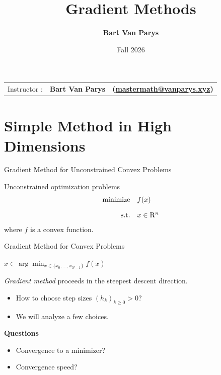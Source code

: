 \documentclass[9pt]{beamer}
\title[Continuous Optimization]{Gradient Methods}
\author[]{\textbf{Bart Van Parys}}
\date[]{Fall 2026}
\begin{document}
\begin{frame}  

  \maketitle

  \vspace{-2em}
  
    \begin{center}
    \begin{tabular}{lll}
      Instructor : & \textbf{Bart Van Parys} & \textbf{(\href{mailto:mastermath@vanparys.xyz}{mastermath@vanparys.xyz})} \\
    \end{tabular}
  \end{center}
  
\end{frame}

\section{Simple Method in High Dimensions}

\begin{frame}{Gradient Method for Unconstrained Convex Problems}

  Unconstrained optimization problems
  \begin{equation*}
    \begin{array}{rl}
      \operatorname{minimize} & f(x) \\[1em]
      \mathrm{s.t.} & x \in \mathrm{R}^n
    \end{array}
  \end{equation*}
  where $f$ is a convex function.

\end{frame}

\begin{frame}{Gradient Method for Convex Problems}

  
  \begin{algorithm}[H]
    \Return $\hat x\in\arg\min_{x\in\{x_0,\dots,x_{N-1}\}} f(x)$
    \caption{Gradient descent}
  \end{algorithm}

  \vfill
  
  \emph{Gradient method} proceeds in the steepest descent direction.
  \begin{itemize}
  \item How to choose step sizes $(h_k)_{k\geq 0}>0$?
  \item We will analyze a few choices.
  \end{itemize}

  \vfill
  
  \textbf{Questions}
  \begin{itemize}
  \item Convergence to a minimizer?
  \item Convergence speed? 
  \end{itemize}
  
\end{frame}
\end{document}
